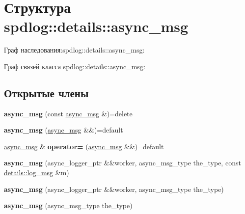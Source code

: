 \hypertarget{structspdlog_1_1details_1_1async__msg}{}\section{Структура spdlog\+:\+:details\+:\+:async\+\_\+msg}
\label{structspdlog_1_1details_1_1async__msg}


Граф наследования\+:spdlog\+:\+:details\+:\+:async\+\_\+msg\+:


Граф связей класса spdlog\+:\+:details\+:\+:async\+\_\+msg\+:
\subsection*{Открытые члены}
\begin{DoxyCompactItemize}
\item 
\mbox{\label{structspdlog_1_1details_1_1async__msg_ac61cf7969d3c60aa377cf4a40df6e6a7}} 
{\bfseries async\+\_\+msg} (const \hyperlink{structspdlog_1_1details_1_1async__msg}{async\+\_\+msg} \&)=delete
\item 
\mbox{\label{structspdlog_1_1details_1_1async__msg_a2e618e34ed69ba387e8e5f069543f94a}} 
{\bfseries async\+\_\+msg} (\hyperlink{structspdlog_1_1details_1_1async__msg}{async\+\_\+msg} \&\&)=default
\item 
\mbox{\label{structspdlog_1_1details_1_1async__msg_a963cf593d81367843c4347603a18c5f8}} 
\hyperlink{structspdlog_1_1details_1_1async__msg}{async\+\_\+msg} \& {\bfseries operator=} (\hyperlink{structspdlog_1_1details_1_1async__msg}{async\+\_\+msg} \&\&)=default
\item 
\mbox{\label{structspdlog_1_1details_1_1async__msg_a6867adb721db681c3f7bd3ee0d6c0358}} 
{\bfseries async\+\_\+msg} (async\+\_\+logger\+\_\+ptr \&\&worker, async\+\_\+msg\+\_\+type the\+\_\+type, const \hyperlink{structspdlog_1_1details_1_1log__msg}{details\+::log\+\_\+msg} \&m)
\item 
\mbox{\label{structspdlog_1_1details_1_1async__msg_ace5999e830cd28f7b14f804952925379}} 
{\bfseries async\+\_\+msg} (async\+\_\+logger\+\_\+ptr \&\&worker, async\+\_\+msg\+\_\+type the\+\_\+type)
\item 
\mbox{\label{structspdlog_1_1details_1_1async__msg_a466b9eb427b14c12f59afeeeb98c0e01}} 
{\bfseries async\+\_\+msg} (async\+\_\+msg\+\_\+type the\+\_\+type)
\end{DoxyCompactItemize}

